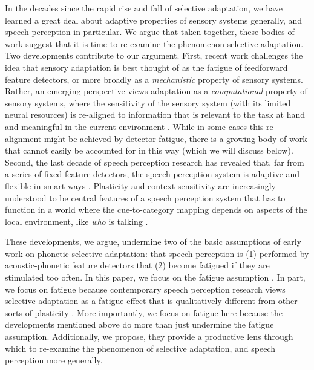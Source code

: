 In the decades since the rapid rise and fall of selective adaptation, we have learned a great deal about adaptive properties of sensory systems generally, and speech perception in particular.  We argue that taken together, these bodies of work suggest that it is time to re-examine the phenomenon selective adaptation.
Two developments contribute to our argument. 
First, recent work challenges the idea that sensory adaptation is best thought of as the fatigue of feedforward feature detectors, or more broadly as a \emph{mechanistic} property of sensory systems. Rather, an emerging perspective views adaptation as a \emph{computational} property of sensory systems, where the sensitivity of the sensory system (with its limited neural resources) is re-aligned to information that is relevant to the task at hand and meaningful in the current environment \autocite[e.g.,][]{Gutnisky2008,Kohn2007,Stocker2006,Webster2005}.  While in some cases this re-alignment might be achieved by detector fatigue, there is a growing body of work that cannot easily be accounted for in this way (which we will discuss below).  Second, the last decade of speech perception research has revealed that, far from a series of fixed feature detectors, the speech perception system is adaptive and flexible in smart ways \autocite[e.g.,][]{Bertelson2003,Bradlow2008,Clayards2008,Kraljic2008a,Maye2008a,Norris2003}.  Plasticity and context-sensitivity are increasingly understood to be central features of a speech perception system that has to function in a world where the cue-to-category mapping depends on aspects of the local environment, like \emph{who} is talking \autocite{Norris2003,Huang2012,Laing2012}.

These developments, we argue, undermine two of the basic assumptions of early work on phonetic selective adaptation: that speech perception is (1) performed by acoustic-phonetic feature detectors that (2) become fatigued if they are stimulated too often.  
\label{r-fd2} In this paper, we focus on the fatigue assumption \autocite[see][for a rejection of the feature detector assumption]{Remez1987}.  In part, we focus on fatigue because contemporary speech perception research views selective adaptation as a fatigue effect that is qualitatively different from other sorts of plasticity \autocite[e.g.,][]{Grabski2013,Vroomen2004,Vroomen2007,VanderZande2014,Zaske2013}.
More importantly, we focus on fatigue here because the developments mentioned above do more than just undermine the fatigue assumption.  Additionally, we propose, they provide a productive lens through which to re-examine the phenomenon of selective adaptation, and speech perception more generally.

